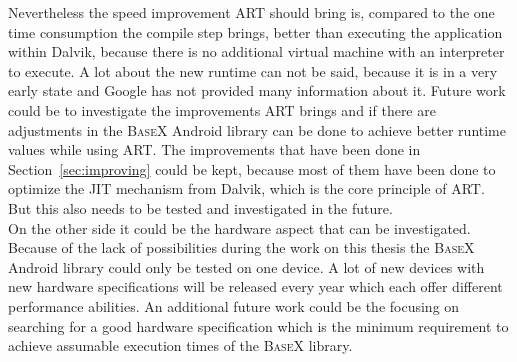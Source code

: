 Nevertheless the speed improvement ART should bring is, compared to the one time consumption the compile step brings, better than executing the application within Dalvik, because there is no additional virtual machine with an interpreter to execute.
A lot about the new runtime can not be said, because it is in a very early state and Google has not provided many information about it.
Future work could be to investigate the improvements ART brings and if there are adjustments in the \textsc{BaseX} Android library can be done to achieve better runtime values while using ART.
The improvements that have been done in Section~\ref{sec:improving} could be kept, because most of them have been done to optimize the JIT mechanism from Dalvik, which is the core principle of ART.
But this also needs to be tested and investigated in the future.\\
On the other side it could be the hardware aspect that can be investigated.
Because of the lack of possibilities during the work on this thesis the \textsc{BaseX} Android library could only be tested on one device.
A lot of new devices with new hardware specifications will be released every year which each offer different performance abilities.
An additional future work could be the focusing on searching for a good hardware specification which is the minimum requirement to achieve assumable execution times of the \textsc{BaseX} library.

